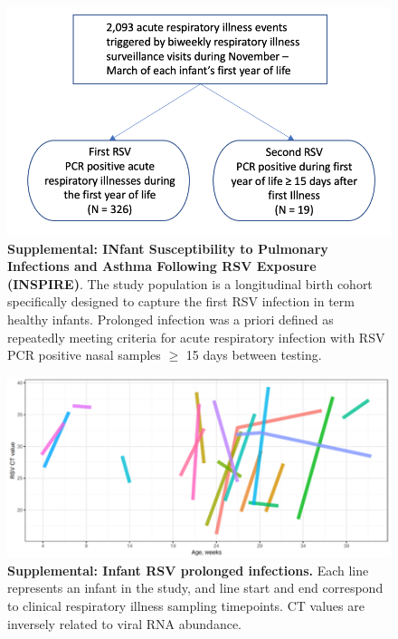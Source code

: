 \documentclass[9pt,lineno]{elife}  %
\begin{document}
\begin{figure}[ht] \hspace*{0cm}  \begin{center}
        \includegraphics[scale=0.4]{flowchart}
	\caption{\textbf{Supplemental: INfant Susceptibility to Pulmonary Infections and Asthma Following RSV Exposure (INSPIRE)}.
	 The study population is a longitudinal birth cohort specifically designed to capture the first RSV infection in term healthy infants. Prolonged infection was a priori defined as repeatedly meeting criteria for acute respiratory infection with RSV PCR positive nasal samples $\ge$ 15 days between testing.}
	\label{fig:1}
 \end{center} \end{figure}


\begin{figure}[ht] \hspace*{0cm}  \begin{center}
    \includegraphics[scale=0.5]{CTvalues}
	\caption{\textbf{Supplemental: Infant RSV prolonged infections.} Each line represents an infant in the study, and line start and end correspond to clinical respiratory illness sampling timepoints. CT values are inversely related to viral RNA abundance.}
	\label{fig:CTvalues}
 \end{center} \end{figure}
 
\end{document}
